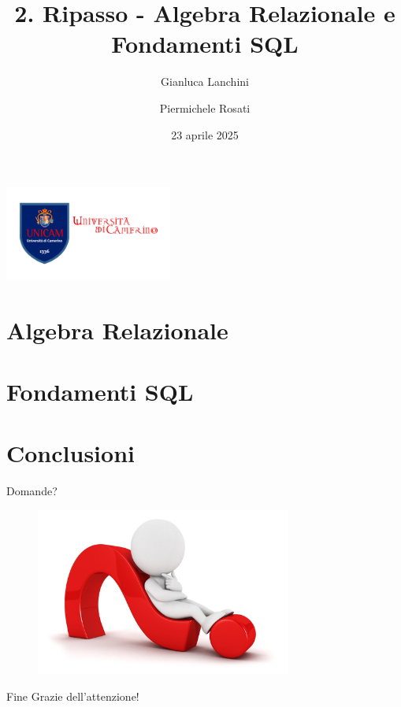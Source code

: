 \documentclass[11pt,aspectratio=169]{beamer}
\author[Gianluca Lanchini \and Piermichele Rosati]{Gianluca Lanchini \and Piermichele Rosati}
\institute[]{\large Universit\`a di Camerino\\ \footnotesize Tutorato - Basi di Dati}
\title[Ripasso - Algebra Relazionale e Fondamenti SQL]{2. Ripasso - Algebra Relazionale e Fondamenti SQL}
\begin{document}
\begin{frame}
\centering
\includegraphics[width=5.5cm]{../img/unicam-logo.jpg}
\date{{23 aprile 2025}}
\titlepage
\end{frame}


\section{Algebra Relazionale}


%
\section{Fondamenti SQL}
   
   
%
\section{Conclusioni}

\begin{frame}{Domande?}
    \begin{figure}
\centering
    \includegraphics[width=0.75\textwidth]{../img/questions.jpg}
\end{figure}
\end{frame}

\begin{frame}{Fine}
    \centering
    \huge Grazie dell'attenzione!
\end{frame}
\end{document}
